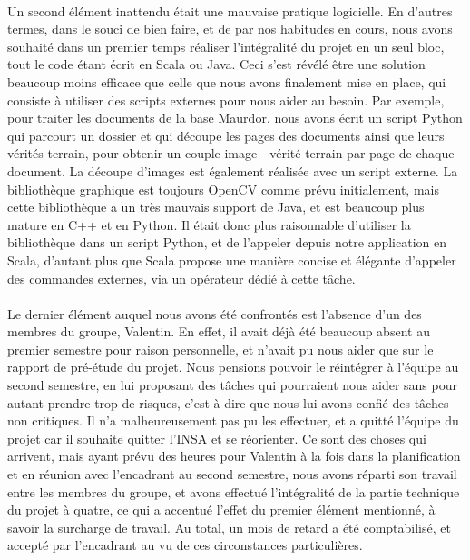 \paragraph{}
Un second élément inattendu était une mauvaise pratique logicielle. En d'autres termes, dans le souci de bien faire, et de par nos habitudes en cours, nous avons souhaité dans un premier temps réaliser l'intégralité du projet en un seul bloc, tout le code étant écrit en Scala ou Java. Ceci s'est révélé être une solution beaucoup moins efficace que celle que nous avons finalement mise en place, qui consiste à utiliser des scripts externes pour nous aider au besoin. Par exemple, pour traiter les documents de la base Maurdor, nous avons écrit un script Python qui parcourt un dossier et qui découpe les pages des documents ainsi que leurs vérités terrain, pour obtenir un couple image - vérité terrain par page de chaque document. La découpe d'images est également réalisée avec un script externe. La bibliothèque graphique est toujours OpenCV comme prévu initialement, mais cette bibliothèque a un très mauvais support de Java, et est beaucoup plus mature en C++ et en Python. Il était donc plus raisonnable d'utiliser la bibliothèque dans un script Python, et de l'appeler depuis notre application en Scala, d'autant plus que Scala propose une manière concise et élégante d'appeler des commandes externes, via un opérateur dédié à cette tâche.

\paragraph{}
Le dernier élément auquel nous avons été confrontés est l'absence d'un des membres du groupe, Valentin. En effet, il avait déjà été beaucoup absent au premier semestre pour raison personnelle, et n'avait pu nous aider que sur le rapport de pré-étude du projet. Nous pensions pouvoir le réintégrer à l'équipe au second semestre, en lui proposant des tâches qui pourraient nous aider sans pour autant prendre trop de risques, c'est-à-dire que nous lui avons confié des tâches non critiques. Il n'a malheureusement pas pu les effectuer, et a quitté l'équipe du projet car il souhaite quitter l'INSA et se réorienter. Ce sont des choses qui arrivent, mais ayant prévu des heures pour Valentin à la fois dans la planification et en réunion avec l'encadrant au second semestre, nous avons réparti son travail entre les membres du groupe, et avons effectué l'intégralité de la partie technique du projet à quatre, ce qui a accentué l'effet du premier élément mentionné, à savoir la surcharge de travail. Au total, un mois de retard a été comptabilisé, et accepté par l'encadrant au vu de ces circonstances particulières.

